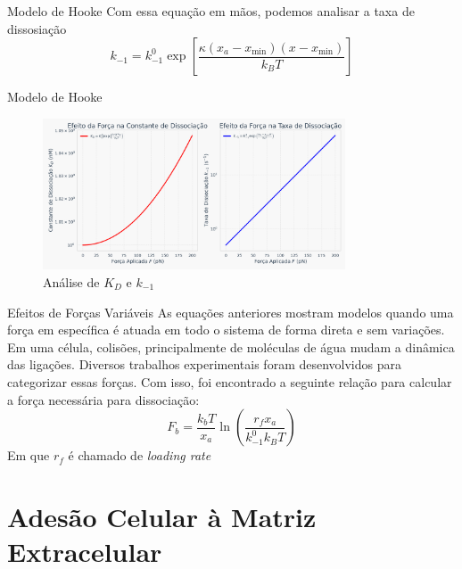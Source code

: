 \documentclass[aspectratio=169]{beamer}
\begin{document}
\begin{frame}{Modelo de Hooke}
    Com essa equação em mãos, podemos analisar a taxa de dissosiação
    \begin{equation}\label{eq:disso-k-hooke}
        k_{-1} = k_{-1}^{0} \exp \left[\frac{\kappa (x_{a} - x_{\min})(x-x_{\min})}{k_{B} T}\right]
    \end{equation}
\end{frame}

\begin{frame}{Modelo de Hooke}
    \begin{figure}
        \includegraphics[width=0.8\textwidth]{img/coef_diss_hooke.png}
        \caption{Análise de $K_D$ e $k_{-1}$}
    \end{figure}
\end{frame}

\begin{frame}{Efeitos de Forças Variáveis}
    As equações anteriores mostram modelos quando uma força em específica é atuada em todo o sistema
    de forma direta e sem variações. Em uma célula, colisões, principalmente de moléculas de água mudam
    a dinâmica das ligações. Diversos trabalhos experimentais foram desenvolvidos para categorizar
    essas forças. Com isso, foi encontrado a seguinte relação para calcular a força necessária para dissociação:
    \begin{equation}
        F_{b} = \frac{k_{b} T}{x_{a}} \ln \left(\frac{r_{f} x_{a}}{k_{-1}^{0} k_{B} T}\right)
    \end{equation}
    Em que $r_{f}$ é chamado de \textit{loading rate}
\end{frame}

\section{Adesão Celular à Matriz Extracelular}
\end{document}
